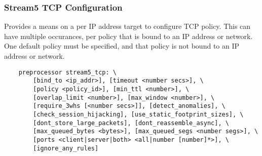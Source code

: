 \documentclass[english]{report}
\begin{document}
\subsubsection{Stream5 TCP Configuration}

Provides a means on a per IP address target to configure TCP policy.  This can
have multiple occurances, per policy that is bound to an IP address or network.
One default policy must be specified, and that policy is not bound to an IP
address or network.

\begin{verbatim}
    preprocessor stream5_tcp: \
        [bind_to <ip_addr>], [timeout <number secs>], \
        [policy <policy_id>], [min_ttl <number>], \
        [overlap_limit <number>], [max_window <number>], \
        [require_3whs [<number secs>]], [detect_anomalies], \
        [check_session_hijacking], [use_static_footprint_sizes], \
        [dont_store_large_packets], [dont_reassemble_async], \
        [max_queued_bytes <bytes>], [max_queued_segs <number segs>], \
        [ports <client|server|both> <all|number [number]*>], \
        [ignore_any_rules]
\end{verbatim}
\end{document}
